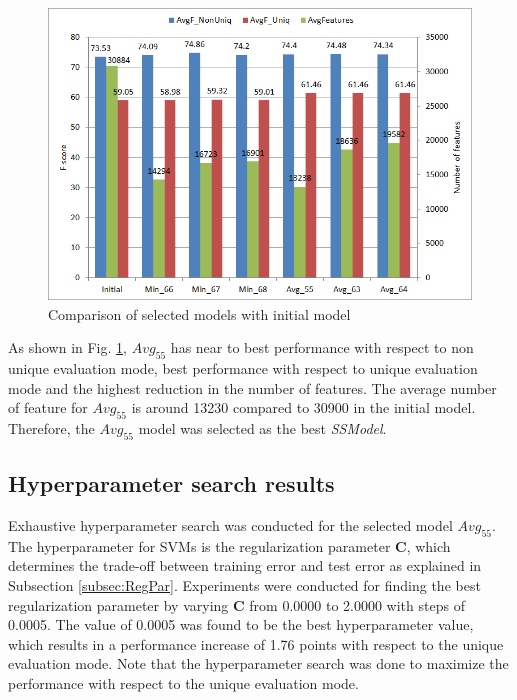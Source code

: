 \begin{figure}
\centering
\includegraphics[scale=0.6]{figures/6ModelsComparison.png}
\caption{Comparison of selected models with initial model}\label{fig:6ModelsComp}
\end{figure}

As shown in Fig. \ref{fig:6ModelsComp}, $Avg_{55}$ has near to best performance with respect to non unique evaluation mode, best performance with respect to unique evaluation mode and the highest reduction in the number of features. The average number of feature for $Avg_{55}$ is around 13230 compared to 30900 in the initial model. Therefore, the $Avg_{55}$ model was selected as the best \textit{SSModel}.


\subsection{Hyperparameter search results}

Exhaustive hyperparameter search was conducted for the selected model $Avg_{55}$. The hyperparameter for SVMs is the regularization parameter $\mathbf{C}$, which determines the trade-off between training error and test error as explained in Subsection \ref{subsec:RegPar}. Experiments were conducted for finding the best regularization parameter by varying $\mathbf{C}$ from 0.0000 to 2.0000 with steps of 0.0005. The value of 0.0005 was found to be the best hyperparameter value, which results in a performance increase of 1.76 points with respect to the unique evaluation mode. Note that the hyperparameter search was done to maximize the performance with respect to the unique evaluation mode.

